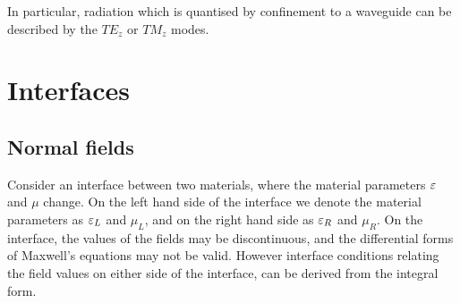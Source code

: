 In particular, radiation which is quantised by confinement to a waveguide can be described by the $TE_z$ or $TM_z$ modes.

\section{Interfaces}
% 
%


\subsection{Normal fields}
Consider an interface between two materials, where the material parameters
$\varepsilon$ and $\mu$ change. On the left hand side of the interface we denote the
material parameters as $\varepsilon_L$ and $\mu_L$, and on the right hand side as
$\varepsilon_R$ and $\mu_R$. On the interface, the values of the fields may be
discontinuous, and the differential forms of Maxwell's equations may not be
valid. However interface conditions relating the field values on either side of
the interface, can be derived from the integral form.

